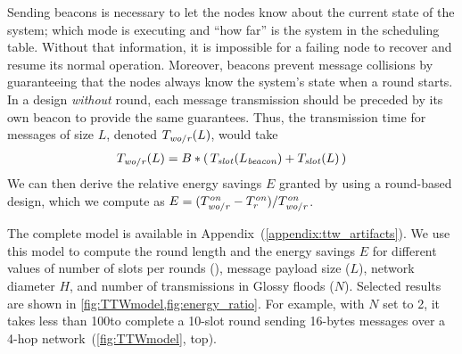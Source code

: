 Sending beacons is necessary to let the nodes know about the current state of the system; \ie which mode is executing and ``how far'' is the system in the scheduling table. Without that information, it is impossible for a failing node to recover and resume its normal operation.
Moreover, beacons prevent message collisions by guaranteeing that the nodes always know the system's state when a round starts.
In a design \emph{without} round, each message transmission should be preceded by its own beacon to provide the same guarantees. Thus, the transmission time for \nslots messages of size $L$, denoted $T_{\mathit{wo/r}}(L)$, would take
%
\begin{align}
T_{\mathit{wo/r}}(L) =  B*( \, T_{\mathit{slot}}(L_{\mathit{beacon}}) + T_{\mathit{slot}}(L) \, )
\end{align}
%
We can then derive the relative energy savings $E$ granted by using a round-based design, which we compute as $E= (T_{\mathit{wo/r}}^{\mathit{on}} - T_{r}^{\mathit{on}})/T_{\mathit{wo/r}}^{\mathit{on}}$.




The complete \TTnet model is available in Appendix~(\cref{appendix:ttw_artifacts}). We use this model to compute the round length \Tround and the energy savings $E$ for different values of number of slots per rounds (\nslots), message payload size ($L$), network diameter $H$, and number of transmissions in Glossy floods ($N$).
Selected results are shown in \cref{fig:TTWmodel,fig:energy_ratio}.
\linebreak
For example, with $N$ set to 2, it takes less than 100\ms to complete a 10-slot round sending 16-bytes messages over a 4-hop network~(\cref{fig:TTWmodel}, top).



